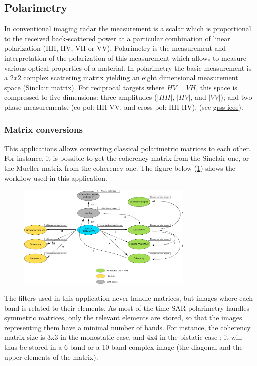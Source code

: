\subsection{Polarimetry}

In conventional imaging radar the measurement is a scalar which is proportional
to the received back-scattered power at a particular combination of linear
polarization (HH, HV, VH or VV). 
Polarimetry is the measurement and interpretation of the polarization of this
measurement which allows to measure various optical properties of a material.
In polarimetry the basic measurement is a $2x2$ complex scattering matrix
yielding an eight dimensional measurement space (Sinclair matrix). For
reciprocal targets where $HV=VH$, this space is compressed to five dimensions:
three amplitudes ($|HH|$, $|HV|$, and $|VV|$); and two phase measurements,
(co-pol: HH-VV, and cross-pol:
HH-HV). (see \href{http://www.grss-ieee.org/technical-briefs/imaging-radar-polarimetry}{grss-ieee}).

\subsubsection{Matrix conversions}

This applications allows converting classical polarimetric matrices to each
other.  For instance, it is possible to get the coherency matrix from the
Sinclair one, or the Mueller matrix from the coherency one.  The figure below
(\ref{fig:polconv}) shows the workflow used in this application.

\begin{figure}[!h]
  \centering
   \includegraphics[width=0.75\textwidth]{../Art/SARImages/sarpol_conversion_schema.png}
  \label{fig:polconv}
\end{figure}

The filters used in this application never handle matrices, but images where
each band is related to their elements.  As most of the time SAR polarimetry
handles symmetric matrices, only the relevant elements are stored, so that the
images representing them have a minimal number of bands.  For instance, the
coherency matrix size is 3x3 in the monostatic case, and 4x4 in the bistatic
case : it will thus be stored in a 6-band or a 10-band complex image (the
diagonal and the upper elements of the matrix).

